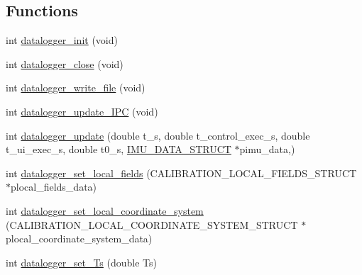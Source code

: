\subsection*{Functions}
\begin{DoxyCompactItemize}
\item 
int \hyperlink{datalogger_01_07C_xC3_xB3pia_01em_01conflito_01de_01Andr_xC3_xA9_01Carvalho_012013-04-26_08_8h_a1977ef253746fd8c008a3641d9822551}{datalogger\-\_\-init} (void)
\item 
int \hyperlink{datalogger_01_07C_xC3_xB3pia_01em_01conflito_01de_01Andr_xC3_xA9_01Carvalho_012013-04-26_08_8h_ad22dbe9e235e7ae5737a23796d13ffbd}{datalogger\-\_\-close} (void)
\item 
int \hyperlink{datalogger_01_07C_xC3_xB3pia_01em_01conflito_01de_01Andr_xC3_xA9_01Carvalho_012013-04-26_08_8h_a2aedecfce53e1935a41615ceaf378013}{datalogger\-\_\-write\-\_\-file} (void)
\item 
int \hyperlink{datalogger_01_07C_xC3_xB3pia_01em_01conflito_01de_01Andr_xC3_xA9_01Carvalho_012013-04-26_08_8h_a25bb814a0877f419ae09b08cd7e91ee9}{datalogger\-\_\-update\-\_\-\-I\-P\-C} (void)
\item 
int \hyperlink{datalogger_01_07C_xC3_xB3pia_01em_01conflito_01de_01Andr_xC3_xA9_01Carvalho_012013-04-26_08_8h_a360547e43bc240bf2ad44656dc70a590}{datalogger\-\_\-update} (double t\-\_\-s, double t\-\_\-control\-\_\-exec\-\_\-s, double t\-\_\-ui\-\_\-exec\-\_\-s, double t0\-\_\-s, \hyperlink{structIMU__DATA__STRUCT}{I\-M\-U\-\_\-\-D\-A\-T\-A\-\_\-\-S\-T\-R\-U\-C\-T} $\ast$pimu\-\_\-data,)
\item 
int \hyperlink{datalogger_01_07C_xC3_xB3pia_01em_01conflito_01de_01Andr_xC3_xA9_01Carvalho_012013-04-26_08_8h_aedb2e01731eb308da0f3a664b29ff18d}{datalogger\-\_\-set\-\_\-local\-\_\-fields} (C\-A\-L\-I\-B\-R\-A\-T\-I\-O\-N\-\_\-\-L\-O\-C\-A\-L\-\_\-\-F\-I\-E\-L\-D\-S\-\_\-\-S\-T\-R\-U\-C\-T $\ast$plocal\-\_\-fields\-\_\-data)
\item 
int \hyperlink{datalogger_01_07C_xC3_xB3pia_01em_01conflito_01de_01Andr_xC3_xA9_01Carvalho_012013-04-26_08_8h_ada9c5776313f813d446d1014822912ad}{datalogger\-\_\-set\-\_\-local\-\_\-coordinate\-\_\-system} (C\-A\-L\-I\-B\-R\-A\-T\-I\-O\-N\-\_\-\-L\-O\-C\-A\-L\-\_\-\-C\-O\-O\-R\-D\-I\-N\-A\-T\-E\-\_\-\-S\-Y\-S\-T\-E\-M\-\_\-\-S\-T\-R\-U\-C\-T $\ast$plocal\-\_\-coordinate\-\_\-system\-\_\-data)
\item 
int \hyperlink{datalogger_01_07C_xC3_xB3pia_01em_01conflito_01de_01Andr_xC3_xA9_01Carvalho_012013-04-26_08_8h_afb69d166f8d53042825174cee225ea49}{datalogger\-\_\-set\-\_\-\-Ts} (double Ts)

\end{DoxyCompactItemize}
